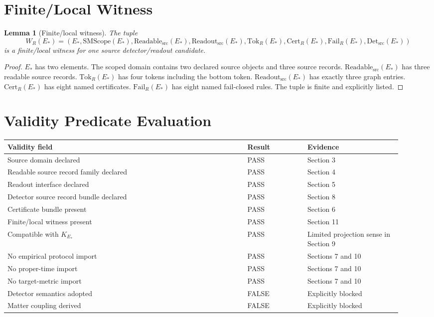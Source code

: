 \documentclass[11pt]{article}
\newcommand{\EStar}{E_{\ast}}
\newcommand{\SMScope}{\mathrm{SMScope}}
\newcommand{\ReadableSrc}{\mathrm{Readable}_{\mathrm{src}}}
\newcommand{\ReadoutSrc}{\mathrm{Readout}_{\mathrm{src}}}
\newcommand{\DetSrc}{\mathrm{Det}_{\mathrm{src}}}
\newcommand{\TokR}{\mathrm{Tok}_{R}}
\newcommand{\CertR}{\mathrm{Cert}_{R}}
\newcommand{\FailR}{\mathrm{Fail}_{R}}
\newtheorem{lemma}{Lemma}
\begin{document}
\section{Finite/Local Witness}

\begin{lemma}[Finite/local witness]
The tuple
\[
  W_R(\EStar)=
  (\EStar,\SMScope(\EStar),\ReadableSrc(\EStar),
   \ReadoutSrc(\EStar),\TokR(\EStar),\CertR(\EStar),
   \FailR(\EStar),\DetSrc(\EStar))
\]
is a finite/local witness for one source detector/readout candidate.
\end{lemma}

\begin{proof}
\(\EStar\) has two elements. The scoped domain contains two declared source
objects and three source records. \(\ReadableSrc(\EStar)\) has three readable
source records. \(\TokR(\EStar)\) has four tokens including the bottom token.
\(\ReadoutSrc(\EStar)\) has exactly three graph entries. \(\CertR(\EStar)\)
has eight named certificates. \(\FailR(\EStar)\) has eight named fail-closed
rules. The tuple is finite and explicitly listed.
\end{proof}

\section{Validity Predicate Evaluation}

\begin{center}
\begin{tabular}{>{\raggedright\arraybackslash}p{0.56\linewidth}
                >{\raggedright\arraybackslash}p{0.14\linewidth}
                >{\raggedright\arraybackslash}p{0.22\linewidth}}
\toprule
Validity field & Result & Evidence \\
\midrule
Source domain declared & PASS & Section 3 \\
Readable source record family declared & PASS & Section 4 \\
Readout interface declared & PASS & Section 5 \\
Detector source record bundle declared & PASS & Section 8 \\
Certificate bundle present & PASS & Section 6 \\
Finite/local witness present & PASS & Section 11 \\
Compatible with \(K_{E_{\ast}}\) & PASS & Limited projection sense in Section 9 \\
No empirical protocol import & PASS & Sections 7 and 10 \\
No proper-time import & PASS & Sections 7 and 10 \\
No target-metric import & PASS & Sections 7 and 10 \\
Detector semantics adopted & FALSE & Explicitly blocked \\
Matter coupling derived & FALSE & Explicitly blocked \\
\bottomrule
\end{tabular}
\end{center}
\end{document}
